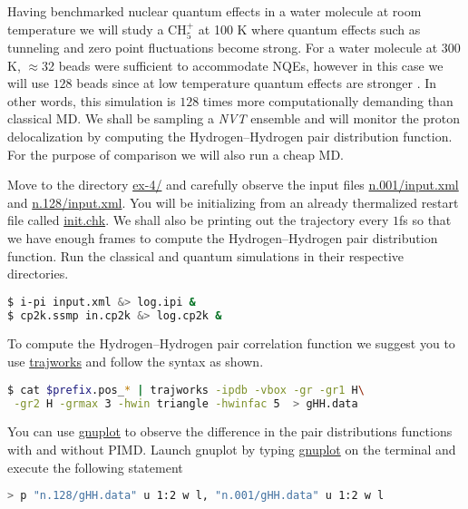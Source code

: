 \documentclass{article}
\begin{document}
\begin{Exercise}[label={ch5},title={PIMD in the strong quantum regime:  gas phase Methanium}]
\noindent Having benchmarked nuclear quantum effects in a water molecule at room temperature 
we will study a $\text{CH}_{5}^{+}$ at 100 K where quantum effects such as tunneling and 
zero point fluctuations become strong. For a water molecule at $300$K, $\approx$32 beads were 
sufficient to accommodate NQEs, however in this case we will use $128$ beads since at low 
temperature quantum effects are stronger . In other words, this simulation is $128$ times more computationally 
demanding than classical MD. We shall be sampling a \emph{NVT} ensemble and will monitor the 
proton delocalization by computing the Hydrogen--Hydrogen pair distribution function. For the 
purpose of comparison we will also run a cheap MD.

\Question
Move to the directory \url{ex-4/} and carefully observe the \ipi{} input files \url{n.001/input.xml} 
and \url{n.128/input.xml}. You will be initializing from an already thermalized restart file called 
\url{init.chk}. We shall also be printing out the trajectory every $1$fs so that we have enough 
frames to compute the Hydrogen--Hydrogen pair distribution function. Run the classical and 
quantum simulations in their respective directories.

\begin{lstlisting}[language=bash]
$ i-pi input.xml &> log.ipi &
$ cp2k.ssmp in.cp2k &> log.cp2k &
\end{lstlisting}

\Question
To compute the Hydrogen--Hydrogen pair correlation function we suggest you to use \url{trajworks} and follow the syntax as shown. 
\begin{lstlisting}[language=bash]
$ cat $prefix.pos_* | trajworks -ipdb -vbox -gr -gr1 H\
 -gr2 H -grmax 3 -hwin triangle -hwinfac 5  > gHH.data 
\end{lstlisting}

\Question
You can use \url{gnuplot} to observe the difference in the pair distributions functions with and without PIMD. 
Launch gnuplot by typing \url{gnuplot} on the terminal and execute the following statement 
\begin{lstlisting}[language=bash]
> p "n.128/gHH.data" u 1:2 w l, "n.001/gHH.data" u 1:2 w l
\end{lstlisting}

\end{Exercise}



\end{document}
